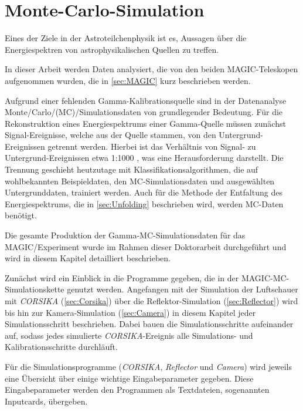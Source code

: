 \chapter{Monte-Carlo-Simulation}
\label{chapter:MC-Simulation}
Eines der Ziele in der Astroteilchenphysik ist es, Aussagen über die Energiespektren von astrophysikalischen Quellen zu treffen.

In dieser Arbeit werden Daten analysiert, die von den beiden MAGIC-Teleskopen \cite{MAGIC_Telescopes} aufgenommen wurden, die in \autoref{sec:MAGIC} kurz beschrieben werden.

Aufgrund einer fehlenden Gamma-Kalibrationsquelle sind in der Datenanalyse Monte\-/Carlo\-/(MC)\-/Simulationsdaten von grundlegender Bedeutung.
Für die Rekonstruktion eines Energiespektrums einer Gamma-Quelle müssen zunächst Signal-Ereignisse, welche aus der Quelle stammen, von den Untergrund-Ereignissen getrennt werden.
Hierbei ist das Verhältnis von Signal- zu Untergrund-Ereignissen etwa 1:1000 \cite{Weekes}, was eine Herausforderung darstellt.
Die Trennung geschieht heutzutage mit Klassifikationsalgorithmen, die auf wohlbekannten Beispieldaten, den MC-Simulationsdaten und ausgewählten Untergrunddaten, trainiert werden.
Auch für die Methode der Entfaltung des Energiespektrums, die in \autoref{sec:Unfolding} beschrieben wird, werden MC-Daten benötigt.

Die gesamte Produktion der Gamma-MC-Simulationsdaten für das MAGIC\-/Experiment wurde im Rahmen dieser Doktorarbeit durchgeführt und wird in diesem Kapitel detailliert beschrieben.

Zunächst wird ein Einblick in die Programme gegeben, die in der MAGIC-MC-Simulationskette genutzt werden.
Angefangen mit der Simulation der Luftschauer mit \textit{CORSIKA} \cite{CORSIKA} (\autoref{sec:Corsika}) über die Reflektor-Simulation \cite{Reflector} (\autoref{sec:Reflector}) wird bis hin zur Kamera-Simulation \cite{Camera} (\autoref{sec:Camera}) in diesem Kapitel jeder Simulationsschritt beschrieben.
Dabei bauen die Simulationsschritte aufeinander auf, sodass jedes simulierte \textit{CORSIKA}-Ereignis alle Simulations- und Kalibrationsschritte durchläuft.

Für die Simulationsprogramme (\textit{CORSIKA}, \textit{Reflector} und \textit{Camera}) wird jeweils eine Übersicht über einige wichtige Eingabeparameter gegeben.
Diese Eingabeparameter werden den Programmen als Textdateien, sogenannten Inputcards, übergeben.

